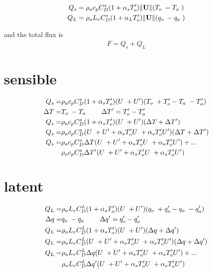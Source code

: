\documentclass[12pt,a4paper]{article}
\newcommand{\Vmag}[1]{\| \mathbf{#1}\|}
\newcommand{\Ub}{U\hspace*{1mm}}
\newcommand{\Up}{U'}
\newcommand{\To}{T_o\hspace*{1mm}}
\newcommand{\Top}{T_o'}
\newcommand{\Ta}{T_a\hspace*{1mm}}
\newcommand{\Tap}{T_a'}
\newcommand{\qo}{q_o\hspace*{1mm}}
\newcommand{\qop}{q_o'}
\newcommand{\qa}{q_a\hspace*{1mm}}
\newcommand{\qap}{q_a'}
\newcommand{\CDs}{C_D^s}
\newcommand{\CDL}{C_D^L}
\begin{document}
\begin{align}
Q_s &= \rho_a c_p C_D^*(1+\alpha_s T_o') \Vmag{U} (\To-\Ta)\\
Q_L &= \rho_a L_v C_D^*(1+\alpha_L T_o') \Vmag{U} (\qo-\qa)
\end{align}

and the total flux is 
\begin{align}
F = Q_s + Q_L
\end{align}


\section*{sensible}
\vspace*{-1cm}
\begin{align*}
Q_s = &\rho_a c_p \CDs(1+\alpha_s \Top) (\Ub+\Up) (\To + \Top -\Ta - \Tap)\\
\Delta T = &\To - \Ta \qquad \Delta T' = \Top - \Tap \\
Q_s = &\rho_a c_p \CDs(1+\alpha_s \Top) (\Ub+\Up) (\Delta T + \Delta T')\\
Q_s = &\rho_a c_p \CDs(\Ub+\Up+\alpha_s \Top\Ub+\alpha_s \Top\Up) (\Delta T + \Delta T')\\
Q_s = &\rho_a c_p \CDs\Delta T (\Ub+\Up+\alpha_s \Top\Ub+\alpha_s \Top\Up) +...\\ 
&\rho_a c_p \CDs\Delta T'(\Ub+\Up+\alpha_s \Top\Ub+\alpha_s \Top\Up)\\
\end{align*}

\section*{latent}
\vspace*{-1cm}
\begin{align*}
Q_L = &\rho_a L_v \CDL(1+\alpha_s \Top) (\Ub+\Up) (\qo + \qop -\qa - \qap)\\
\Delta q = &\qo - \qa \qquad \Delta q' = \qop - \qap \\
Q_L = &\rho_a L_v \CDL(1+\alpha_s \Top) (\Ub+\Up) (\Delta q + \Delta q')\\
Q_L = &\rho_a L_v \CDL(\Ub+\Up+\alpha_s \Top\Ub+\alpha_s \Top\Up) (\Delta q + \Delta q')\\
Q_L = &\rho_a L_v \CDL\Delta q (\Ub+\Up+\alpha_s \Top\Ub+\alpha_s \Top\Up) +...\\ 
&\rho_a L_v \CDL\Delta q'(\Ub+\Up+\alpha_s \Top\Ub+\alpha_s \Top\Up)\\
\end{align*}
\end{document}
